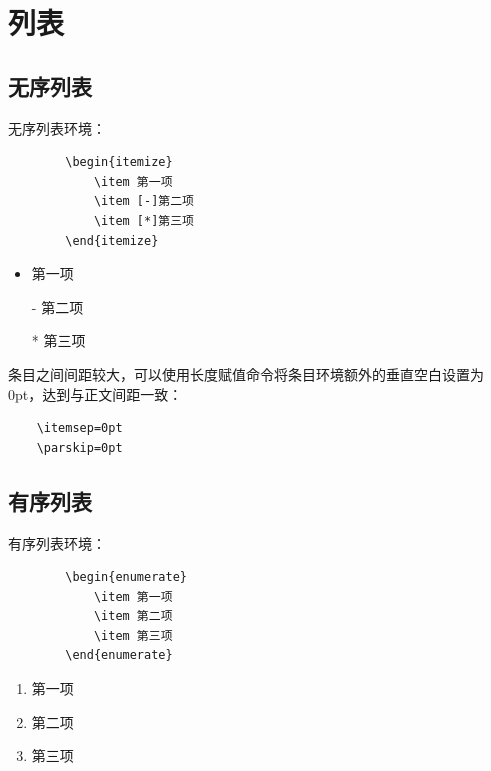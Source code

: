 \section{列表}\label{sec:list}

\subsection{无序列表}\label{subsec:itemize}
无序列表环境：

\vspace{2em}
\begin{minipage}{0.45\textwidth}
    \begin{lstlisting}
        \begin{itemize}
            \item 第一项
            \item [-]第二项
            \item [*]第三项
        \end{itemize}
    \end{lstlisting}
\end{minipage}
\begin{minipage}{0.45\textwidth}
    \begin{itemize}
        \item 第一项
        \item [-]第二项
        \item [*]第三项
    \end{itemize}
\end{minipage}

条目之间间距较大，可以使用长度赋值命令将条目环境额外的垂直空白设置为0pt，达到与正文间距一致：

\begin{lstlisting}
    \itemsep=0pt
    \parskip=0pt
\end{lstlisting}


\subsection{有序列表}\label{subsec:enumerate}
有序列表环境：

\vspace{2em}
\begin{minipage}{0.45\textwidth}
    \begin{lstlisting}
        \begin{enumerate}
            \item 第一项
            \item 第二项
            \item 第三项
        \end{enumerate}
    \end{lstlisting}
\end{minipage}
\begin{minipage}{0.45\textwidth}
    \begin{enumerate}
        \item 第一项
        \item 第二项
        \item 第三项
    \end{enumerate}
\end{minipage}

